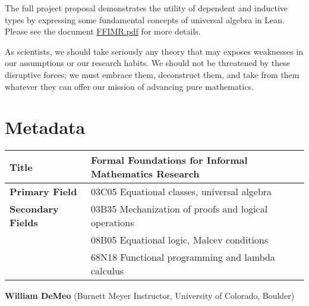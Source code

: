 \documentclass[11pt]{amsart}  %
\begin{document}
The full project proposal demonstrates the utility of dependent and inductive types by expressing some fundamental concepts of universal algebra in Lean.  
Please see the document \href{https://github.com/williamdemeo/job-app/blob/master/research/FFIMR.pdf}{FFIMR.pdf} for more details.

As scientists, we should take seriously any theory that may exposes weaknesses in our assumptions or our research habits.  We should not be threatened by these disruptive forces; we must embrace them, deconstruct them, and take from them whatever they can offer our mission of advancing pure mathematics.

\bigskip

\appendix

\section{Metadata}

\begin{table}[h]
  \begin{tabular}{|l|l|}
  \hline
  {\bf Title} & Formal Foundations for Informal Mathematics Research \\
  \hline
  {\bf Primary Field} & 03C05 Equational classes, universal algebra\\ %
  \hline
  {\bf Secondary Fields} & 
  03B35 Mechanization of proofs and logical operations\\ %
  & 08B05  Equational logic, Malcev conditions\\
  & 68N18  Functional programming and lambda calculus\\ %
  \hline
  \end{tabular}
  \end{table}
  

\vskip2mm
\hskip4.7mm {\bf William DeMeo} (Burnett Meyer Instructor, University of Colorado, Boulder)

\vskip5mm

\end{document}
